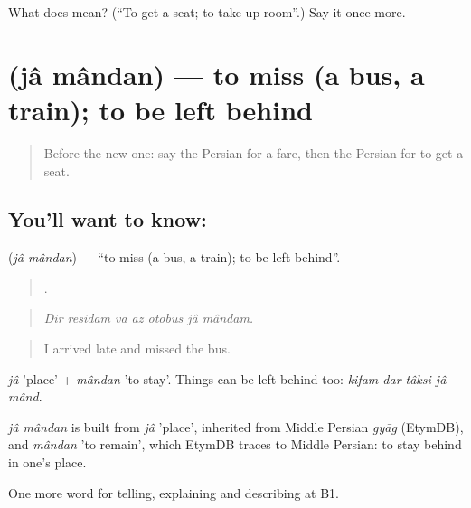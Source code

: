 \begin{tcolorbox}[breakable,colback=teal!4,colframe=teal!35!black,title={Before you move on}]
What does   mean? (\textquotedblleft{}To get a seat; to take up room\textquotedblright{}.) Say it once more.
\end{tcolorbox}
\section[\texorpdfstring{\fa{جا} \fa{ماندن} (jâ mândan)}{جا ماندن (jâ mândan)}]{  (jâ mândan) — to miss (a bus, a train); to be left behind}

\label{lesson:FA-C434-ja-mandan}



\begin{quote}
Before the new one: say the Persian for a fare, then the Persian for to get a seat.
\end{quote}

\subsection*{You'll want to know:  }
\textbf{ } (\emph{jâ mândan}) — \textquotedblleft{}to miss (a bus, a train); to be left behind\textquotedblright{}.

\begin{quote}
      .
\end{quote}

\begin{quote}
\emph{Dir residam va az otobus jâ mândam.}
\end{quote}

\begin{quote}
I arrived late and missed the bus.
\end{quote}

\emph{jâ} 'place' + \emph{mândan} 'to stay'. Things can be left behind too: \emph{kifam dar tâksi jâ mând}.

\begin{cousinweb}
\emph{jâ mândan} is built from \emph{jâ} 'place', inherited from Middle Persian \emph{gyāg} (EtymDB), and \emph{mândan} 'to remain', which EtymDB traces to Middle Persian: to stay behind in one's place.
\end{cousinweb}

\begin{grammarlens}[title={What you've built}]
One more word for telling, explaining and describing at B1.
\end{grammarlens}

